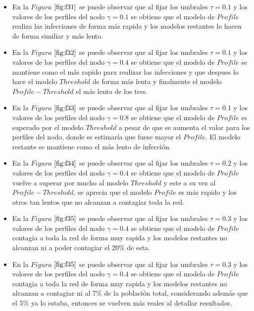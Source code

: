 \documentclass{article}
\begin{document}
\begin{itemize}
	\item En la $Figura$ $\ref{fig:f31}$ se puede observar que al fijar los umbrales $\tau = 0.1$ y los valores de los perfiles del nodo $\gamma = 0.1$ se obtiene que el modelo de $Profile$ realiza las infecciones de forma más rapida y los modelos restantes lo hacen de forma similiar y más lento.
	\item En la $Figura$ $\ref{fig:f32}$ se puede observar que al fijar los umbrales $\tau = 0.1$ y los valores de los perfiles del nodo $\gamma = 0.4$ se obtiene que el modelo de $Profile$ se mantiene como el más rapido para realizar las infecciones y que despues lo hace el modelo $Threshold$ de forma más lenta y finalmente el modelo $Profile-Threshold$ el más lento de los tres.
	\item En la $Figura$ $\ref{fig:f33}$ se puede observar que al fijar los umbrales $\tau = 0.1$ y los valores de los perfiles del nodo $\gamma = 0.8$ se obtiene que el modelo de $Profile$ es superado por el modelo $Threshold$ a pesar de que se aumenta el valor para los perfiles del nodo, donde se estimaría que fuese mayor el $Profile$. El modelo restante se mantiene como el más lento de infección.
	\item En la $Figura$ $\ref{fig:f34}$ se puede observar que al fijar los umbrales $\tau = 0.2$ y los valores de los perfiles del nodo $\gamma = 0.4$ se obtiene que el modelo de $Profile$ vuelve a superar por mucho al modelo $Threshold$ y este a su vez al $Profile-Threshold$, se aprecia que el modelo $Profile$ es más rapido y los otros tan lentos que no alcanzan a contagiar toda la red.
	\item En la $Figura$ $\ref{fig:f35}$ se puede observar que al fijar los umbrales $\tau = 0.3$ y los valores de los perfiles del nodo $\gamma = 0.4$ se obtiene que el modelo de $Profile$ contagia a toda la red de forma muy rapida y los modelos restantes no alcanzan ni a poder contagiar el 20\% de esta.
	\item En la $Figura$ $\ref{fig:f35}$ se puede observar que al fijar los umbrales $\tau = 0.3$ y los valores de los perfiles del nodo $\gamma = 0.4$ se obtiene que el modelo de $Profile$ contagia a toda la red de forma muy rapida y los modelos restantes no alcanzan a contagiar ni al 7\% de la población total, considerando además que el 5\% ya lo estaba, entonces se vuelven más reales al detallar resultados.
\end{itemize}
\end{document}
